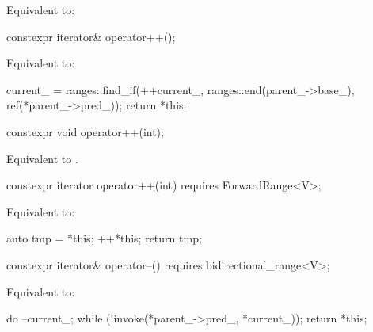 \begin{itemdescr}
\pnum
\effects
Equivalent to: 
\end{itemdescr}

%
\begin{itemdecl}
constexpr iterator& operator++();
\end{itemdecl}

\begin{itemdescr}
\pnum
\effects Equivalent to:
\begin{codeblock}
current_ = ranges::find_if(++current_, ranges::end(parent_->base_), ref(*parent_->pred_));
return *this;
\end{codeblock}
\end{itemdescr}

%
\begin{itemdecl}
constexpr void operator++(int);
\end{itemdecl}

\begin{itemdescr}
\pnum
\effects Equivalent to .
\end{itemdescr}

%
\begin{itemdecl}
constexpr iterator operator++(int) requires ForwardRange<V>;
\end{itemdecl}

\begin{itemdescr}
\pnum
\effects Equivalent to:
\begin{codeblock}
auto tmp = *this;
++*this;
return tmp;
\end{codeblock}
\end{itemdescr}

%
\begin{itemdecl}
constexpr iterator& operator--() requires bidirectional_range<V>;
\end{itemdecl}

\begin{itemdescr}
\pnum
\effects Equivalent to:
\begin{codeblock}
do
  --current_;
while (!invoke(*parent_->pred_, *current_));
return *this;
\end{codeblock}
\end{itemdescr}

